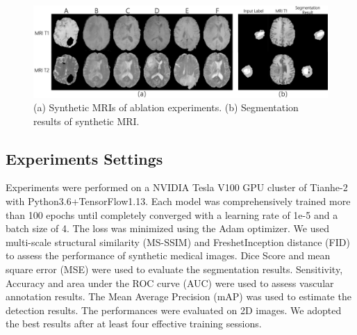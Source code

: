 \documentclass[runningheads]{llncs}
\begin{document}
	\begin{figure}[th]
		\centering
		\includegraphics[width=0.9\linewidth]{figures/ablation}
		\caption{(a) Synthetic MRIs of ablation experiments. (b) Segmentation results of synthetic MRI. }
		\label{ablation_and_seg}
	\end{figure}
	\begin{table}[th]
		\begin{center}
			\caption{Lesion generation methods experiments.}
			\label{label_test}
		\end{center}
	\end{table}
	\subsection{Experiments Settings}
	Experiments were performed on a NVIDIA Tesla V100 GPU cluster of Tianhe-2 with Python3.6+TensorFlow1.13. Each model was comprehensively trained more than 100 epochs until completely converged with a learning rate of 1e-5 and a batch size of 4. The loss was minimized using the Adam optimizer. 
	We used multi-scale structural similarity (MS-SSIM) and FreshetInception distance (FID)\cite{100karras2017progressive} to assess the performance of synthetic medical images. Dice Score\cite{95dice1945measures} and mean square error (MSE) were used to evaluate the segmentation results. Sensitivity, Accuracy and area under the ROC curve (AUC) were used to assess vascular annotation results. The Mean Average Precision (mAP) was used to estimate the detection results. The performances were evaluated on 2D images. We adopted the best results after at least four effective training sessions.
\end{document}
